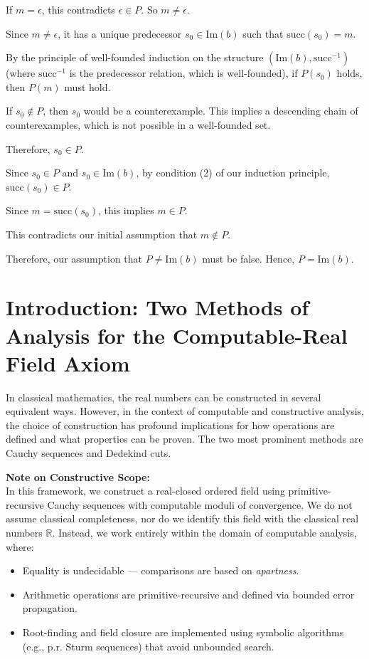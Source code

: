 \documentclass[12pt, a4paper]{article}
\begin{document}
If \( m = \epsilon \), this contradicts \( \epsilon \in P \). So \( m \neq \epsilon \).

Since \( m \neq \epsilon \), it has a unique predecessor \( s_0 \in \mathrm{Im}(b) \) such that \(\mathrm{succ}(s_0) = m\).

By the principle of well-founded induction on the structure \((\mathrm{Im}(b), \mathrm{succ}^{-1})\) (where \(\mathrm{succ}^{-1}\) is the predecessor relation, which is well-founded), if \( P(s_0) \) holds, then \( P(m) \) must hold.

If \( s_0 \notin P \), then \( s_0 \) would be a counterexample. This implies a descending chain of counterexamples, which is not possible in a well-founded set.

Therefore, \( s_0 \in P \).

Since \( s_0 \in P \) and \( s_0 \in \mathrm{Im}(b) \), by condition (2) of our induction principle, \( \mathrm{succ}(s_0) \in P \).

Since \( m = \mathrm{succ}(s_0) \), this implies \( m \in P \).

This contradicts our initial assumption that \( m \notin P \).

Therefore, our assumption that \( P \neq \mathrm{Im}(b) \) must be false. Hence, \( P = \mathrm{Im}(b) \).
\hrulefill

\section{Introduction: Two Methods of Analysis for the Computable-Real Field Axiom}

In classical mathematics, the real numbers can be constructed in several equivalent ways. However, in the context of computable and constructive analysis, the choice of construction has profound implications for how operations are defined and what properties can be proven. The two most prominent methods are Cauchy sequences and Dedekind cuts.

\textbf{Note on Constructive Scope:} \\
In this framework, we construct a real-closed ordered field using primitive-recursive Cauchy sequences with computable moduli of convergence. We do not assume classical completeness, nor do we identify this field with the classical real numbers \(\mathbb{R}\). Instead, we work entirely within the domain of computable analysis, where:

\begin{itemize}
    \item Equality is undecidable — comparisons are based on \textit{apartness}.
    \item Arithmetic operations are primitive-recursive and defined via bounded error propagation.
    \item Root-finding and field closure are implemented using symbolic algorithms (e.g., p.r. Sturm sequences) that avoid unbounded search.
\end{itemize}
\end{document}
